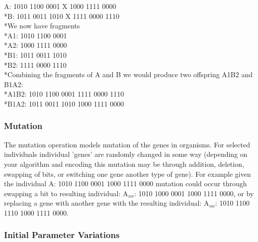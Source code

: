 \begin{center}
A: 1010 1100 0001 X 1000 1111 0000
\\*B: 1011 0011 1010 X 1111 0000 1110
\vspace{2 mm}
\\*We now have fragments 
\\*A1: 1010 1100 0001 
\\*A2: 1000 1111 0000
\\*B1: 1011 0011 1010 
\\*B2: 1111 0000 1110
\vspace{2 mm}
\\*Combining the fragments of A and B we would produce two offspring A1B2 and B1A2:
\vspace{2 mm}
\\*A1B2: 1010 1100 0001 1111 0000 1110
\\*B1A2: 1011 0011 1010 1000 1111 0000
\end{center}

\subsubsection{Mutation}
The mutation operation models mutation of the genes in organisms. For selected individuals individual 'genes' are randomly 
changed in some way (depending on your algorithm and encoding this mutation may be through addition, deletion, swapping of 
bits, or switching one gene another type of gene).
For example given the individual A:  1010 1100 0001 1000 1111 0000 mutation could occur through swapping a bit to resulting 
individual: A\(_{sw}\):   1010 1000 0001 1000 1111 0000, or by replacing a gene with another gene with the resulting individual:
A\(_{sw}\):   1010 1100 1110 1000 1111 0000.

\subsubsection{Initial Parameter Variations}


